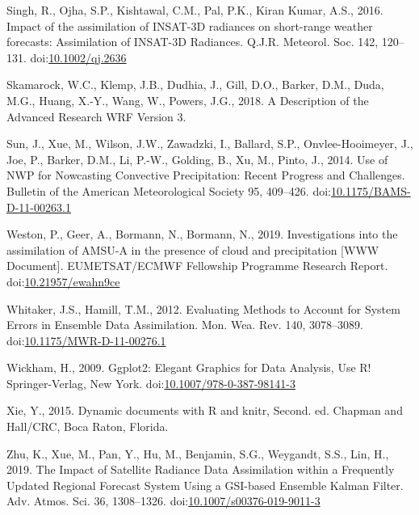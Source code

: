 \documentclass[final,5p,times,twocolumn,authoryear]{elsarticle} %
\begin{document}
\leavevmode\hypertarget{ref-singh2016}{}%
Singh, R., Ojha, S.P., Kishtawal, C.M., Pal, P.K., Kiran Kumar, A.S., 2016. Impact of the assimilation of INSAT-3D radiances on short-range weather forecasts: Assimilation of INSAT-3D Radiances. Q.J.R. Meteorol. Soc. 142, 120--131. doi:\href{https://doi.org/10.1002/qj.2636}{10.1002/qj.2636}

\leavevmode\hypertarget{ref-skamarock2018}{}%
Skamarock, W.C., Klemp, J.B., Dudhia, J., Gill, D.O., Barker, D.M., Duda, M.G., Huang, X.-Y., Wang, W., Powers, J.G., 2018. A Description of the Advanced Research WRF Version 3.

\leavevmode\hypertarget{ref-sun2014}{}%
Sun, J., Xue, M., Wilson, J.W., Zawadzki, I., Ballard, S.P., Onvlee-Hooimeyer, J., Joe, P., Barker, D.M., Li, P.-W., Golding, B., Xu, M., Pinto, J., 2014. Use of NWP for Nowcasting Convective Precipitation: Recent Progress and Challenges. Bulletin of the American Meteorological Society 95, 409--426. doi:\href{https://doi.org/10.1175/BAMS-D-11-00263.1}{10.1175/BAMS-D-11-00263.1}

\leavevmode\hypertarget{ref-weston2019}{}%
Weston, P., Geer, A., Bormann, N., Bormann, N., 2019. Investigations into the assimilation of AMSU-A in the presence of cloud and precipitation {[}WWW Document{]}. EUMETSAT/ECMWF Fellowship Programme Research Report. doi:\href{https://doi.org/10.21957/ewahn9ce}{10.21957/ewahn9ce}

\leavevmode\hypertarget{ref-whitaker2012}{}%
Whitaker, J.S., Hamill, T.M., 2012. Evaluating Methods to Account for System Errors in Ensemble Data Assimilation. Mon. Wea. Rev. 140, 3078--3089. doi:\href{https://doi.org/10.1175/MWR-D-11-00276.1}{10.1175/MWR-D-11-00276.1}

\leavevmode\hypertarget{ref-wickham2009}{}%
Wickham, H., 2009. Ggplot2: Elegant Graphics for Data Analysis, Use R! Springer-Verlag, New York. doi:\href{https://doi.org/10.1007/978-0-387-98141-3}{10.1007/978-0-387-98141-3}

\leavevmode\hypertarget{ref-xie2015}{}%
Xie, Y., 2015. Dynamic documents with R and knitr, Second. ed. Chapman and Hall/CRC, Boca Raton, Florida.

\leavevmode\hypertarget{ref-zhu2019}{}%
Zhu, K., Xue, M., Pan, Y., Hu, M., Benjamin, S.G., Weygandt, S.S., Lin, H., 2019. The Impact of Satellite Radiance Data Assimilation within a Frequently Updated Regional Forecast System Using a GSI-based Ensemble Kalman Filter. Adv. Atmos. Sci. 36, 1308--1326. doi:\href{https://doi.org/10.1007/s00376-019-9011-3}{10.1007/s00376-019-9011-3}
\end{document}
